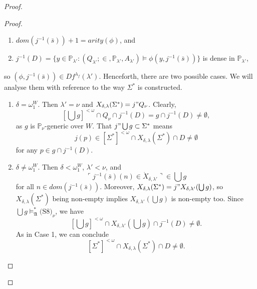 \documentclass[12pt]{article}
\numberwithin{equation}{section}
\begin{document}
\begin{proof}
\begin{proof}
\begin{enumerate}[label=<$k$> $\eq$ \arabic* :, leftmargin=70pt]
\begin{enumerate}[label=(\alph*)]
        \item $dom(j^{-1}(\bar{s})) + 1 = arity(\phi)$, and
        \item $j^{-1}(D) = \{y \in \mathbb{P}_{\lambda'} : (Q_{\lambda'}; \in, \mathbb{P}_{\lambda'}, A_{\lambda'}) \models \phi(y, j^{-1}(\bar{s}))\}$ is dense in $\mathbb{P}_{\lambda'}$,
    \end{enumerate}
    so $(\phi, j^{-1}(\bar{s})) \in Df^{\lambda_f}(\lambda')$. Henceforth, there are two possible cases. We will analyse them with reference to the way $\Sigma^*$ is constructed. 
    \begin{enumerate}[label=Case \arabic*:, leftmargin=50pt]
        \item\label{c8c1} $\delta = \omega_1^W$. Then $\lambda' = \nu$ and $X_{\delta, \lambda}(\Sigma^*) = j" Q_{\nu}$. Clearly, $$[\bigcup g]^{< \omega} \cap Q_{\nu} \cap j^{-1}(D) = g \cap j^{-1}(D) \neq \emptyset,$$ as $g$ is $\mathbb{P}_{\nu}$-generic over $W$. That $j" \bigcup g \subset \Sigma^*$ means $$j(p) \in [\Sigma^*]^{< \omega} \cap X_{\delta, \lambda}(\Sigma^*) \cap D \neq \emptyset$$ for any $p \in g \cap j^{-1}(D)$.
        \item $\delta \neq \omega_1^W$. Then $\delta < \omega_1^W$, $\lambda' < \nu$, and $$\ulcorner j^{-1}(\bar{s})(n) \in \dot{X}_{\delta, \lambda'} \urcorner \in \bigcup g$$ for all $n \in dom(j^{-1}(\bar{s}))$. Moreover, $X_{\delta, \lambda}(\Sigma^*) = j" X_{\delta, \lambda'}(\bigcup g)$, so $X_{\delta, \lambda}(\Sigma^*)$ being non-empty implies $X_{\delta, \lambda'}(\bigcup g)$ is non-empty too. Since $\bigcup g \models^*_{\mathfrak{A}} \text{(S8)}_{\nu}$, we have $$[\bigcup g]^{< \omega} \cap X_{\delta, \lambda'}(\bigcup g) \cap j^{-1}(D) \neq \emptyset.$$ As in Case 1, we can conclude $$[\Sigma^*]^{< \omega} \cap X_{\delta, \lambda}(\Sigma^*) \cap D \neq \emptyset.$$
    \end{enumerate}
\end{enumerate}


\end{proof}
\end{proof}
\end{document}
